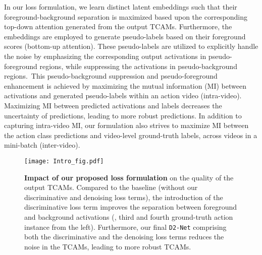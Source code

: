 \documentclass[10pt,twocolumn,letterpaper]{article}
\def\proposed{\texttt{D2-Net}{}}
\begin{document}
In our loss formulation, we learn distinct latent embeddings such that their foreground-background separation is maximized based upon the corresponding top-down attention generated from the output TCAMs. 
Furthermore, the embeddings are employed to generate pseudo-labels based on their foreground scores (bottom-up attention). These pseudo-labels are utilized to explicitly handle the noise by emphasizing the corresponding output activations in pseudo-foreground regions, while suppressing the activations in pseudo-background regions.~This pseudo-background suppression and pseudo-foreground enhancement is achieved by maximizing the mutual information (MI) between activations and generated pseudo-labels within an action video (intra-video). Maximizing MI between predicted activations and labels decreases the uncertainty of predictions, leading to more robust predictions. In addition to capturing intra-video MI, our formulation also strives to maximize MI between the action class predictions and video-level ground-truth labels, across videos in a mini-batch (inter-video).  





\begin{figure}[t]
    \centering
    \texttt{[image: Intro\_fig.pdf]}
    \vspace{-0.1cm}
    \caption{\textbf{Impact of our proposed loss formulation} on the quality of the output TCAMs. Compared to the baseline (without our discriminative and denoising loss terms), the introduction of the discriminative loss term improves the separation between foreground and background activations (\eg, third and fourth ground-truth action instance from the left). Furthermore, our final \proposed{} comprising both the discriminative and the denoising loss terms reduces the noise in the TCAMs, leading to more robust TCAMs.  
\vspace{-0.3cm}}
    \label{fig:denoise_intuition}
\end{figure}
\end{document}
